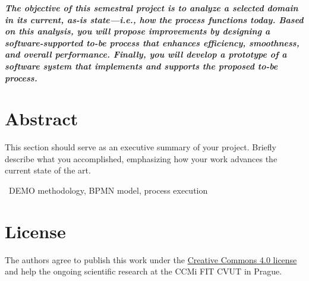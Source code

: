 \textit{\textbf{The objective of this semestral project is to analyze a selected domain in its current, as-is state—i.e., how the process functions today. Based on this analysis, you will propose improvements by designing a software-supported to-be process that enhances efficiency, smoothness, and overall performance. Finally, you will develop a prototype of a software system that implements and supports the proposed to-be process.}}

\section*{Abstract}


This section should serve as an executive summary of your project. Briefly describe what you accomplished, emphasizing how your work advances the current state of the art.

\bigskip



~DEMO methodology, BPMN model, process execution

\vfill

\section*{License}
The authors agree to publish this work under the \href{https://creativecommons.org/licenses/by/4.0/}{Creative Commons 4.0 license} and help the ongoing scientific research at the CCMi FIT CVUT in Prague. 